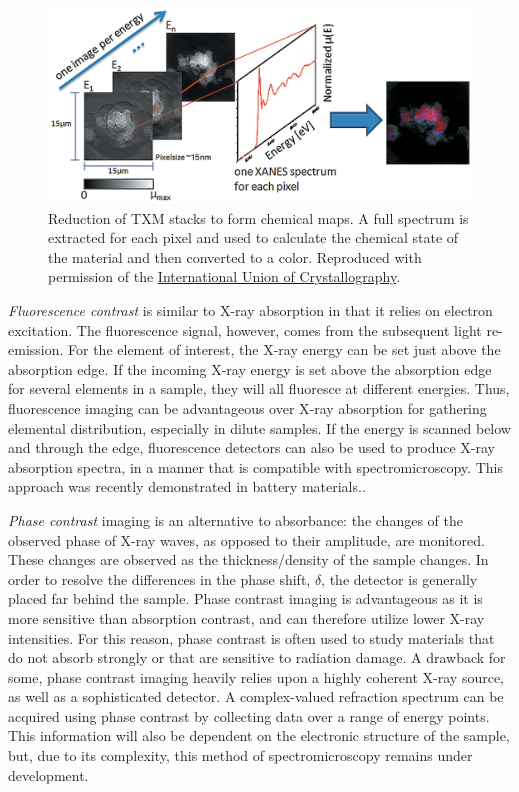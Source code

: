 \documentclass[journal=cmatex,manuscript=perspective]{achemso}
\newcommand{\iucr}{Reproduced with permission of the
  \href{http://journals.iucr.org/}{International Union of
    Crystallography}.}
\begin{document}
\begin{figure}
  \includegraphics[width=\textwidth]{meirer2011-2.png}
  \caption{Reduction of TXM stacks to form chemical maps. A full
    spectrum is extracted for each pixel and used to calculate the
    chemical state of the material and then converted to a
    color.\cite{meirer2011} \iucr}
  \label{figure:meirer2011-2}
\end{figure}

\emph{Fluorescence contrast} is similar to X-ray absorption in that it
relies on electron excitation. The fluorescence signal, however, comes
from the subsequent light re-emission. For the element of interest,
the X-ray energy can be set just above the absorption edge. If the
incoming X-ray energy is set above the absorption edge for several
elements in a sample, they will all fluoresce at different
energies. Thus, fluorescence imaging can be advantageous over X-ray
absorption for gathering elemental distribution, especially in dilute
samples. If the energy is scanned below and through the edge,
fluorescence detectors can also be used to produce X-ray absorption
spectra, in a manner that is compatible with spectromicroscopy. This
approach was recently demonstrated in battery
materials.\cite{chueh2015}.

\emph{Phase contrast} imaging is an alternative to absorbance: the
changes of the observed phase of X-ray waves, as opposed to their
amplitude, are monitored. These changes are observed as the
thickness/density of the sample changes. In order to resolve the
differences in the phase shift, $\delta$, the detector is generally
placed far behind the sample. Phase contrast imaging is advantageous
as it is more sensitive than absorption contrast, and can therefore
utilize lower X-ray intensities. For this reason, phase contrast is
often used to study materials that do not absorb strongly or that are
sensitive to radiation damage. A drawback for some, phase contrast
imaging heavily relies upon a highly coherent X-ray source, as well as
a sophisticated detector. A complex-valued refraction spectrum can be
acquired using phase contrast by collecting data over a range of
energy points. This information will also be dependent on the
electronic structure of the sample, but, due to its complexity, this
method of spectromicroscopy remains under
development\cite{farmand2017}.
\end{document}
